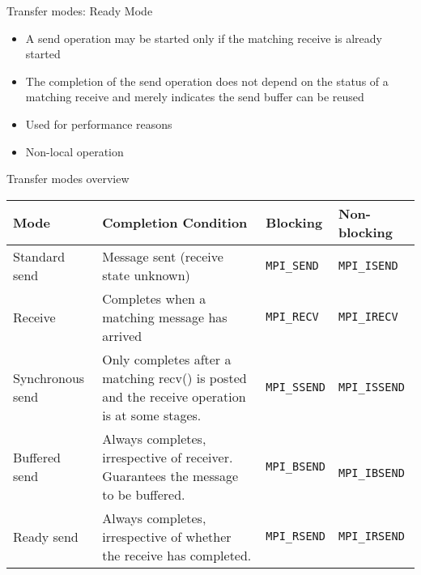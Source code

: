 \documentclass[aspectratio=43]{beamer}
\begin{document}
\begin{frame}{Transfer modes: Ready Mode}
\begin{itemize}
\item A send operation may be started only if the matching receive is already started
\item The completion of the send operation does not depend on the status of a matching receive and merely indicates the send buffer can be reused
\item Used for performance reasons
\item Non-local operation
\end{itemize}
\end{frame}

\begin{frame}[fragile]{Transfer modes overview}
\small

\begin{tabular}{|l|p{3.7cm}|l|l|}
\hline
\textbf{Mode} & \textbf{Completion Condition} & \textbf{Blocking} & \textbf{Non-blocking}\\\hline
    Standard send & Message sent (receive state unknown)&  \verb+MPI_SEND+ & \verb+MPI_ISEND+ \\\hline
    Receive & Completes when a matching message has arrived & \verb+MPI_RECV+ & \verb+MPI_IRECV+ \\\hline
Synchronous send & Only completes after a matching recv() is posted and the receive operation is at some stages. & \verb+MPI_SSEND+ & \verb+MPI_ISSEND+ \\\hline
Buffered send & Always completes, irrespective of receiver. Guarantees the message to be buffered. & \verb+MPI_BSEND+ & \verb+ MPI_IBSEND+ \\\hline

Ready send & Always completes, irrespective of whether the receive has completed. & \verb+MPI_RSEND+ & \verb+MPI_IRSEND+ \\\hline
\end{tabular}


\end{frame}
\end{document}
